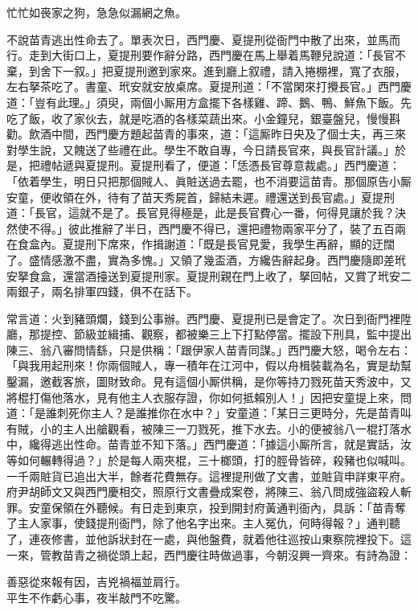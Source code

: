 \begin{myquote}
忙忙如䘮家之狗，急急似漏網之魚。
\end{myquote}

不說苗青逃出性命去了。單表次日，西門慶、夏提刑從衙門中散了出來，並馬而行。走到大街口上，夏提刑要作辭分路，西門慶在馬上舉着馬鞭兒說道：「長官不棄，到舍下一叙。」把夏提刑邀到家來。進到廳上叙禮，請入捲棚裡，寬了衣服，左右拏茶吃了。書童、玳安就安放桌席。夏提刑道：「不當閑來打攪長官。」西門慶道：「豈有此理。」須臾，兩個小厮用方盒擺下各樣雞、蹄、鵝、鴨、鮮魚下飯。先吃了飯，收了家伙去，就是吃酒的各樣菜蔬出來。小金鐘兒，銀臺盤兒，慢慢斟勸。飲酒中間，西門慶方題起苗青的事來，道：「這厮昨日央及了個士夫，再三來對學生說，又餽送了些禮在此。學生不敢自專，今日請長官來，與長官計議。」於是，把禮帖遞與夏提刑。夏提刑看了，便道：「恁憑長官尊意裁處。」西門慶道：「依着學生，明日只把那個賊人、眞賍送過去罷，也不消要這苗青。那個原告小厮安童，便收領在外，待有了苗天秀屍首，歸結未遲。禮還送到長官處。」夏提刑道：「長官，這就不是了。長官見得極是，此是長官費心一番，何得見讓於我？決然使不得。」彼此推辭了半日，西門慶不得已，還把禮物兩家平分了，裝了五百兩在食盒內。夏提刑下席來，作揖謝道：「既是長官見愛，我學生再辭，顯的迂闊了。盛情感激不盡，實為多愧。」又領了幾盃酒，方纔告辭起身。西門慶隨即差玳安拏食盒，還當酒擡送到夏提刑家。夏提刑親在門上收了，拏回帖，又賞了玳安二兩銀子，兩名排軍四錢，俱不在話下。

常言道：火到豬頭爛，錢到公事辦。西門慶、夏提刑已是會定了。次日到衙門裡陞廳，那提控、節級並緝捕、觀察，都被樂三上下打點停當。擺設下刑具，監中提出陳三、翁八審問情繇，只是供稱：「跟伊家人苗青同謀。」西門慶大怒，喝令左右：「與我用起刑來！你兩個賊人，專一積年在江河中，假以舟楫裝載為名，實是劫幫鑿漏，邀截客旅，圖財致命。見有這個小厮供稱，是你等持刀戮死苗天秀波中，又將棍打傷他落水，見有他主人衣服存證，你如何抵賴別人！」因把安童提上來，問道：「是誰刺死你主人？是誰推你在水中？」安童道：「某日三更時分，先是苗青叫有賊，小的主人出艙觀看，被陳三一刀戮死，推下水去。小的便被翁八一棍打落水中，纔得逃出性命。苗青並不知下落。」西門慶道：「據這小厮所言，就是實話，汝等如何輾轉得過？」於是每人兩夾棍，三十榔頭，打的脛骨皆碎，殺豬也似喊叫。一千兩賍貨已追出大半，餘者花費無存。這裡提刑做了文書，並賍貨申詳東平府。府尹胡師文又與西門慶相交，照原行文書疊成案卷，將陳三、翁八問成強盜殺人斬罪。安童保領在外聽候。有日走到東京，投到開封府黃通判衙內，具訴：「苗青奪了主人家事，使錢提刑衙門，除了他名字出來。主人冤仇，何時得報？」通判聽了，連夜修書，並他訴狀封在一處，與他盤費，就着他往巡按山東察院裡投下。這一來，管教苗青之禍從頭上起，西門慶往時做過事，今朝沒興一齊來。有詩為證：

\begin{myquote}
善惡從來報有因，吉兇禍福並肩行。\\平生不作虧心事，夜半敲門不吃驚。
\end{myquote}

